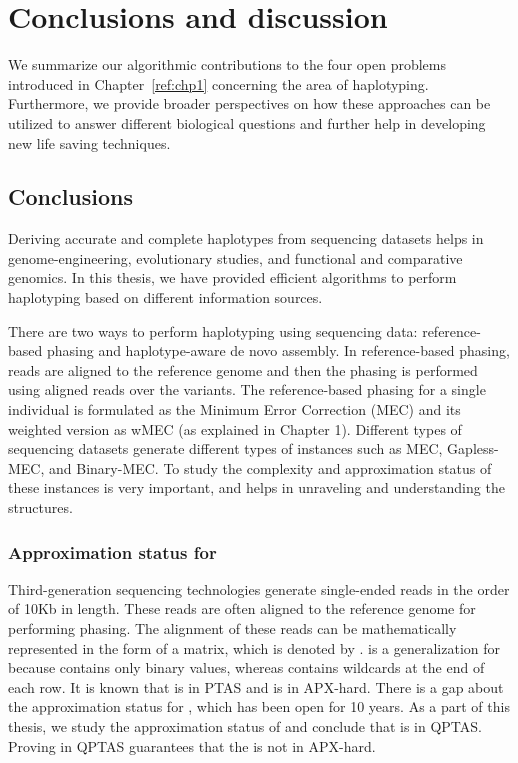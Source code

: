 \chapter{Conclusions and discussion}
We summarize our algorithmic contributions to the four open problems introduced in Chapter~\ref{ref:chp1} concerning the area of haplotyping.
Furthermore, we provide broader perspectives on how these approaches can be utilized to answer different biological questions and further help in developing new life saving techniques.

\section{Conclusions}
Deriving accurate and complete haplotypes from sequencing datasets helps in genome-engineering, evolutionary studies, and functional and comparative genomics.
In this thesis, we have provided efficient algorithms to perform haplotyping based on different information sources.

There are two ways to perform haplotyping using sequencing data: reference-based phasing and haplotype-aware de novo assembly.
In reference-based phasing, reads are aligned to the reference genome and then the phasing is performed using aligned reads over the variants.
The reference-based phasing for a single individual is formulated as the Minimum Error Correction (MEC) and its weighted version as wMEC (as explained in Chapter 1).
Different types of sequencing datasets generate different types of instances such as MEC, Gapless-MEC, and Binary-MEC.
To study the complexity and approximation status of these instances is very important, and helps in unraveling and understanding the structures.

\subsection{Approximation status for \GMEC}
Third-generation sequencing technologies generate single-ended reads in the order of 10Kb in length. These reads are often aligned to the reference genome for performing phasing.
The alignment of these reads can be mathematically represented in the form of a matrix, which is denoted by \GMEC.
\GMEC is a generalization for \BMEC because \BMEC contains only binary values, whereas \GMEC contains wildcards at the end of each row. 
It is known that \BMEC is in PTAS and \MEC is in APX-hard.
There is a gap about the approximation status for \GMEC, which has been open for 10 years.  
As a part of this thesis, we study the approximation status of \GMEC and conclude that \GMEC is in QPTAS.
Proving \GMEC in QPTAS guarantees that the \GMEC is not in APX-hard.

